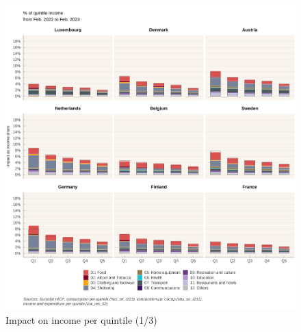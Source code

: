 \documentclass[
  9pt,
  a4paper,
  numbers=noendperiod,
  DIV=12]{scrartcl}
\begin{document}
\begin{figure}[htb]

\caption{\label{fig-impact1}Impact on income per quintile (1/3)}

{\centering \includegraphics[width=1\textwidth,height=\textheight]{SIWU_brief_files/figure-pdf/fig-impact1-1.png}

}

\end{figure}
\end{document}
